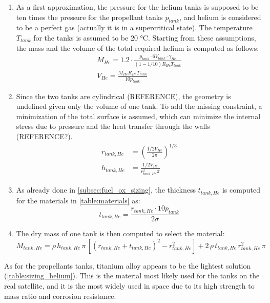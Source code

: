 \begin{enumerate}[itemsep=5mm]
    \item
    As a first approximation, the pressure for the helium tanks is supposed to be ten times the pressure for the propellant tanks $p_{tank}$, and helium is considered to be a perfect gas (actually it is in a supercritical state).
    The temperature $T_{tank}$ for the tanks is assumed to be $20$ °C. Starting from these assumptions, the mass and the volume of the total required helium is computed as follows:
    \begin{gather}
        M_{He} = 1.2 \cdot \frac{p_{tank} \cdot 6 V_{tank} \cdot \gamma_{He}}{\left( 1 - 1/10 \right) R_{He} T_{tank}}
        \\
        V_{He} = \frac{M_{He} R_{He} T_{tank}}{10 p_{tank}}
    \end{gather}

    \item
    Since the two tanks are cylindrical (REFERENCE), the geometry is undefined given only the volume of one tank. To add the missing constraint, a minimization of the total surface is assumed, which can minimize the internal stress due to pressure and the heat transfer through the walls (REFERENCE?).
    \begin{align}
        r_{tank,He} &= \left( \frac{1/2 V_{He}}{2 \pi} \right)^{1/3}
        \\
        h_{tank,He} &= \frac{1/2 V_{He}}{r_{tank,He}^2 \pi}
    \end{align}

    \item
    As already done in \autoref{subsec:fuel_ox_sizing}, the thickness $t_{tank,He}$ is computed for the materials in \autoref{table:materials} as:
    \begin{equation}
        t_{tank,He} = \frac{r_{tank,He} \cdot 10 p_{tank}}{2 \sigma}
    \end{equation}

    \item
    The dry mass of one tank is then computed to select the material:
    \begin{equation}
        M_{tank,He} = \rho \, h_{tank,He} \, \pi \, \left[ \left( r_{tank,He} + t_{tank,He} \right)^2 - r_{tank,He}^2 \right] + 2 \, \rho \, t_{tank,He} \, r_{tank,He}^2 \, \pi
    \end{equation}
\end{enumerate}

As for the propellants tanks, titanium alloy appears to be the lightest solution (\autoref{table:sizing_helium}). This is the material most likely used for the tanks on the real satellite, and it is the most widely used in space due to its high strength to mass ratio and corrosion resistance.

